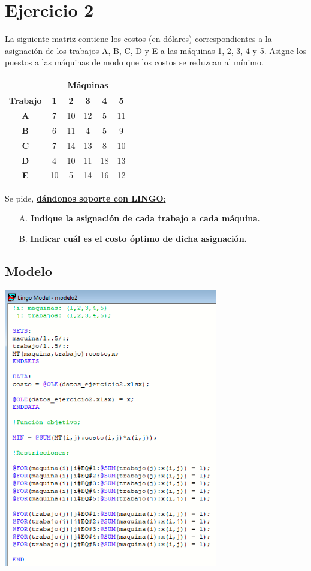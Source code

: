 \documentclass[12pt]{article}
\begin{document}
\newpage
\section*{Ejercicio 2}
\noindent La siguiente matriz contiene los costos (en dólares) correspondientes a la asignación de los trabajos 
A, B, C, D y E a las máquinas 1, 2, 3, 4 y 5. Asigne los puestos a las máquinas de modo que los costos se reduzcan al mínimo.
\begin{center}
\begin{tabular}{|c|c|c|c|c|c|}
  \hline
  & \multicolumn{5}{c|}{\textbf{Máquinas}} \\
  \hline
  \textbf{Trabajo} & \textbf{1} & \textbf{2} & \textbf{3} & \textbf{4} & \textbf{5} \\
  \hline
  \textbf{A} & 7 & 10 & 12 & 5 & 11 \\
  \hline
  \textbf{B} & 6 & 11 & 4 & 5 & 9 \\
  \hline
  \textbf{C} & 7 & 14 & 13 & 8 & 10 \\
  \hline
  \textbf{D} & 4 & 10 & 11 & 18 & 13 \\
  \hline
  \textbf{E} & 10 & 5 & 14 & 16 & 12 \\
  \hline
\end{tabular}
\end{center}

\noindent Se pide, \underline{\textbf{dándonos soporte con LINGO}:}
\begin{itemize}
  \item [A.] \textbf{Indique la asignación de cada trabajo a cada máquina.}
  \item [B.] \textbf{Indicar cuál es el costo óptimo de dicha asignación.}
\end{itemize}

\subsection*{Modelo}
\begin{center}
  \includegraphics[width=0.7\textwidth]{./assets/model2.PNG}
\end{center}
\end{document}
